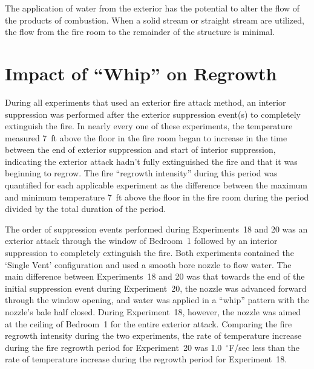 \documentclass[12pt,oneside]{book}
\begin{document}
The application of water from the exterior has the potential to alter the flow of the products of combustion. When a solid stream or straight stream are utilized, the flow from the fire room to the remainder of the structure is minimal.  

\section{Impact of ``Whip'' on Regrowth}
During all experiments that used an exterior fire attack method, an interior suppression was performed after the exterior suppression event(s) to completely extinguish the fire. In nearly every one of these experiments, the temperature measured 7~ft above the floor in the fire room began to increase in the time between the end of exterior suppression and start of interior suppression, indicating the exterior attack hadn't fully extinguished the fire and that it was beginning to regrow. The fire ``regrowth intensity'' during this period was quantified for each applicable experiment as the difference between the maximum and minimum temperature 7~ft above the floor in the fire room during the period divided by the total duration of the period.

The order of suppression events performed during Experiments~18 and 20 was an exterior attack through the window of Bedroom~1 followed by an interior suppression to completely extinguish the fire. Both experiments contained the `Single Vent' configuration and used a smooth bore nozzle to flow water. The main difference between Experiments~18 and 20 was that towards the end of the initial suppression event during Experiment~20, the nozzle was advanced forward through the window opening, and water was applied in a ``whip'' pattern with the nozzle's bale half closed. During Experiment~18, however, the nozzle was aimed at the ceiling of Bedroom~1 for the entire exterior attack. Comparing the fire regrowth intensity during the two experiments, the rate of temperature increase during the fire regrowth period for Experiment~20 was 1.0~$^\circ$F/sec less than the rate of temperature increase during the regrowth period for Experiment~18.
\end{document}

